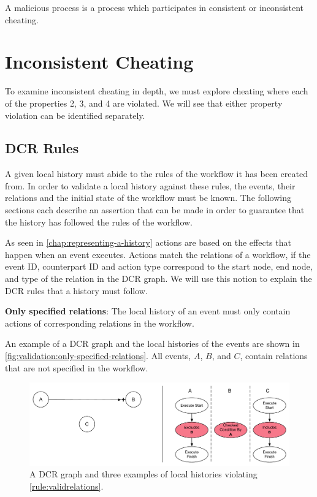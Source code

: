 	\newpar A malicious process is a process which participates in consistent or inconsistent cheating.
	
	\section{Inconsistent Cheating}
	To examine inconsistent cheating in depth, we must explore cheating where each of the properties 2, 3, and 4 are violated. We will see that either property violation can be identified separately.
		
	\subsection{DCR Rules}
	A given local history must abide to the rules of the workflow it has been created from. 
	In order to validate a local history against these rules, the events, their relations and the initial state of the workflow must be known. The following sections each describe an assertion that can be made in order to guarantee that the history has followed the rules of the workflow.
	
	\newpar As seen in \autoref{chap:representing-a-history} actions are based on the effects that happen when an event executes. Actions match the relations of a workflow, if the event ID, counterpart ID and action type correspond to the start node, end node, and type of the relation in the DCR graph. We will use this notion to explain the DCR rules that a history must follow.
	
	\begin{ruledef}
		\textbf{Only specified relations}: The local history of an event must only contain actions of corresponding relations in the workflow.
		\label{rule:validrelations}
	\end{ruledef}
	
	\noindent An example of a DCR graph and the local histories of the events are shown in \autoref{fig:validation:only-specified-relations}. All events, $A$, $B$, and $C$, contain relations that are not specified in the workflow.
	
	\begin{figure}[H]
		\centering
		\includegraphics[width=\textwidth]{6validation/images/only-specified-relations.pdf}
		\caption{A DCR graph and three examples of local histories violating \autoref{rule:validrelations}.}
		\label{fig:validation:only-specified-relations}
	\end{figure}
	
